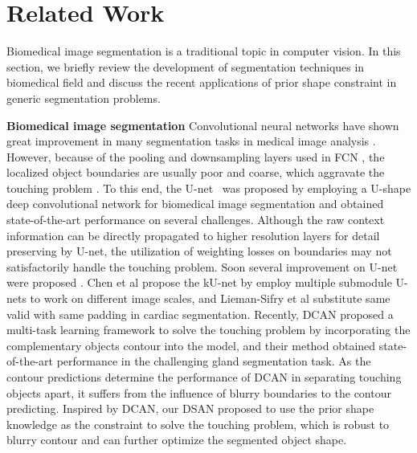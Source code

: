 \section{Related Work}
Biomedical image segmentation is a traditional topic in computer vision.
In this section, we briefly review the development of segmentation techniques in biomedical field and discuss the recent applications of prior shape constraint in generic segmentation problems.

\textbf{Biomedical image segmentation} Convolutional neural networks have shown great improvement in many segmentation tasks in medical image analysis \cite{Dhungel2015a,Roth2015a,Roth2016,Chen2016e,Nogues2016,Dou2016,Qin2016,Chen2017,Ronneberger2015,Lieman-Sifry2017,Chen2016c}.
However, because of the pooling and downsampling layers used in FCN \cite{Long2015}, the localized object boundaries are usually poor and coarse, which aggravate the touching problem \cite{Dou2016,Chen2017,Ronneberger2015,Lieman-Sifry2017,Chen2016c}.
To this end, the U-net~\cite{Ronneberger2015} was proposed by employing a U-shape deep convolutional network for biomedical image segmentation and obtained state-of-the-art performance on several challenges.
Although the raw context information can be directly propagated to higher resolution layers for detail preserving by U-net, the utilization of weighting losses on boundaries may not satisfactorily handle the touching problem.
Soon several improvement on U-net were proposed \cite{Lieman-Sifry2017,Chen2016c,Cicek2016}.
Chen et al \cite{Chen2016c} propose the kU-net by employ multiple submodule U-nets to work on different image scales, and Lieman-Sifry et al \cite{Lieman-Sifry2017} substitute same valid with same padding in cardiac segmentation.
Recently, DCAN \cite{Chen2017} proposed a multi-task learning framework to solve the touching problem by incorporating the complementary objects contour into the model, and their method obtained state-of-the-art performance in the challenging gland segmentation task.
As the contour predictions determine the performance of DCAN in separating touching objects apart, it suffers from the influence of blurry boundaries to the contour predicting.
Inspired by DCAN, our DSAN proposed to use the prior shape knowledge as the constraint to solve the touching problem, which is robust to blurry contour and can further optimize the segmented object shape.

